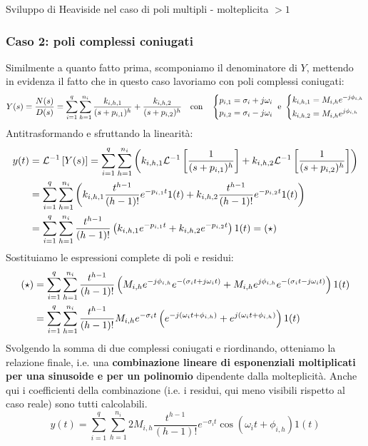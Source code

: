 \begin{defin}{Sviluppo di Heaviside nel caso di poli multipli - molteplicita $> 1$}{}
\subsubsection{Caso 2: poli complessi coniugati}
Similmente a quanto fatto prima, scomponiamo il denominatore di $Y$, mettendo in evidenza il fatto che in questo caso lavoriamo con poli complessi coniugati:
\begin{equation*}
Y(s) = \frac{N(s)}{D(s)} = \sum_{i=1}^q \sum_{h=1}^{n_i} \frac{k_{i,h,1}}{(s+p_{i,1})^h} + \frac{k_{i,h,2}}{(s+p_{i,2})^h} \quad \textrm{con} \quad \begin{dcases}
p_{i,1} = \sigma_i + j\omega_i \\
p_{i,2} = \sigma_i - j\omega_i
\end{dcases} \ \textrm{e} \ \begin{dcases}
k_{i,h,1} = M_{i,h}e^{-j\phi_{i,h}} \\
k_{i,h,2} = M_{i,h}e^{j\phi_{i,h}}
\end{dcases}
\end{equation*}
Antitrasformando e sfruttando la linearità:
\begin{align*}
y(t) & = \mathcal{L}^{-1}\left[ Y(s) \right] = \sum_{i=1}^q \sum_{h=1}^{n_i}\left( k_{i,h,1} \mathcal{L}^{-1}\left[ \frac{1}{(s+p_{i,1})^h} \right] +k_{i,h,2} \mathcal{L}^{-1}\left[ \frac{1}{(s+p_{i,2})^h} \right] \right) \\ & = \sum_{i=1}^q \sum_{h=1}^{n_i}\left( k_{i,h,1} \frac{t^{h-1}}{(h-1)!}e^{-p_{i,1}t}1(t) +k_{i,h,2} \frac{t^{h-1}}{(h-1)!}e^{-p_{i,2}t}1(t) \right) \\ & = \sum_{i=1}^q \sum_{h=1}^{n_i}\frac{t^{h-1}}{(h-1)!}\left( k_{i,h,1} e^{-p_{i,1}t} +k_{i,h,2} e^{-p_{i,2}t} \right)1(t) = (\star) 
\end{align*}
Sostituiamo le espressioni complete di poli e residui:
\begin{align*}
(\star) & = \sum_{i=1}^q \sum_{h=1}^{n_i}\frac{t^{h-1}}{(h-1)!}\left( M_{i,h}e^{-j\phi_{i,h}}e^{-(\sigma_i t + j\omega_i t)} +M_{i,h}e^{j\phi_{i,h}}e^{-(\sigma_i t - j\omega_i t)} \right)1(t) \\ & = \sum_{i=1}^q \sum_{h=1}^{n_i}\frac{t^{h-1}}{(h-1)!}M_{i,h}e^{-\sigma_i t}\left( e^{- j(\omega_i t+\phi_{i,h})} +e^{j(\omega_i t + \phi_{i,h})} \right)1(t)
\end{align*}
Svolgendo la somma di due complessi coniugati e riordinando, otteniamo la relazione finale, i.e. una \textbf{combinazione lineare di esponenziali moltiplicati per una sinusoide e per un polinomio} dipendente dalla molteplicità. Anche qui i coefficienti della combinazione (i.e. i residui, qui meno visibili rispetto al caso reale) sono tutti calcolabili. 
\begin{equation}
\boxed{y(t) = \sum_{i=1}^q \sum_{h=1}^{n_i}2M_{i,h}\frac{t^{h-1}}{(h-1)!}e^{-\sigma_i t}\cos(\omega_i t + \phi_{i,h})1(t)}
\end{equation}
\end{defin}
